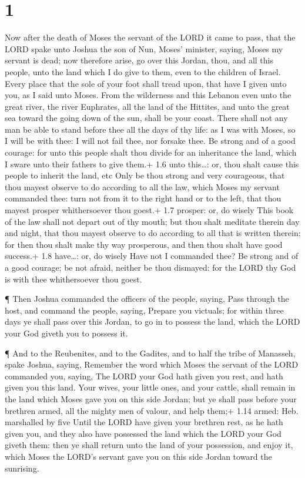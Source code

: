 \hypertarget{section}{%
\section{1}\label{section}}

 Now after the death of Moses the servant of the LORD it
came to pass, that the LORD spake unto Joshua the son of Nun, Moses'
minister, saying,  Moses my servant is dead; now therefore
arise, go over this Jordan, thou, and all this people, unto the land
which I do give to them, even to the children of Israel. 
Every place that the sole of your foot shall tread upon, that have I
given unto you, as I said unto Moses.  From the wilderness
and this Lebanon even unto the great river, the river Euphrates, all the
land of the Hittites, and unto the great sea toward the going down of
the sun, shall be your coast.  There shall not any man be
able to stand before thee all the days of thy life: as I was with Moses,
so I will be with thee: I will not fail thee, nor forsake thee.
 Be strong and of a good courage: for unto this people shalt
thou divide for an inheritance the land, which I sware unto their
fathers to give them.+ 1.6 unto this\ldots: or, thou shalt cause this
people to inherit the land, etc  Only be thou strong and
very courageous, that thou mayest observe to do according to all the
law, which Moses my servant commanded thee: turn not from it to the
right hand or to the left, that thou mayest prosper whithersoever thou
goest.+ 1.7 prosper: or, do wisely  This book of the law
shall not depart out of thy mouth; but thou shalt meditate therein day
and night, that thou mayest observe to do according to all that is
written therein: for then thou shalt make thy way prosperous, and then
thou shalt have good success.+ 1.8 have\ldots: or, do wisely
 Have not I commanded thee? Be strong and of a good courage;
be not afraid, neither be thou dismayed: for the LORD thy God is with
thee whithersoever thou goest.

 ¶ Then Joshua commanded the officers of the people,
saying,  Pass through the host, and command the people,
saying, Prepare you victuals; for within three days ye shall pass over
this Jordan, to go in to possess the land, which the LORD your God
giveth you to possess it.

 ¶ And to the Reubenites, and to the Gadites, and to half
the tribe of Manasseh, spake Joshua, saying,  Remember the
word which Moses the servant of the LORD commanded you, saying, The LORD
your God hath given you rest, and hath given you this land.
 Your wives, your little ones, and your cattle, shall
remain in the land which Moses gave you on this side Jordan; but ye
shall pass before your brethren armed, all the mighty men of valour, and
help them;+ 1.14 armed: Heb. marshalled by five  Until the
LORD have given your brethren rest, as he hath given you, and they also
have possessed the land which the LORD your God giveth them: then ye
shall return unto the land of your possession, and enjoy it, which Moses
the LORD's servant gave you on this side Jordan toward the sunrising.

